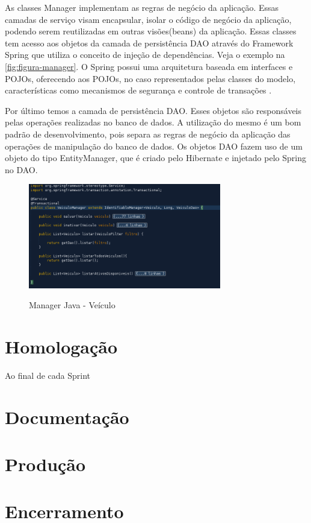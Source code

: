 As classes Manager implementam as regras de negócio da aplicação. Essas camadas de serviço visam encapsular, isolar o código de negócio da aplicação, podendo serem reutilizadas em outras visões(beans) da aplicação. Essas classes tem acesso aos objetos da camada de persistência DAO através do Framework Spring que utiliza o conceito de injeção de dependências. Veja o exemplo na \autoref{fig:figura-manager}. 
O Spring possui uma arquitetura baseada em interfaces e POJOs, oferecendo aos POJOs, no caso representados pelas classes do modelo, características como mecanismos de segurança e controle de transações \cite{WikipediaSpring2017}. 

Por último temos a camada de persistência DAO. Esses objetos são responsáveis pelas operações realizadas no banco de dados. A utilização do mesmo é um bom padrão de desenvolvimento, pois separa as regras de negócio da aplicação das operações de manipulação do banco de dados. Os objetos DAO fazem uso de um objeto do tipo EntityManager, que é criado pelo Hibernate e injetado pelo Spring no DAO. 

\begin{figure}[!htb]
    \centering
    \caption{Manager Java - Veículo}
    \includegraphics[width=0.75\textwidth]{dados/figuras/manager.png}
    \label{fig:figura-manager}
\end{figure}



\section{Homologação}
\label{sec:atividadesRealizadasHomologacao}

Ao final de cada Sprint 



\section{Documentação}
\label{sec:atividadesRealizadasDocumentacao}


\section{Produção}
\label{sec:atividadesRealizadasProdução}


\section{Encerramento}
\label{sec:atividadesRealizadasEncerramento}